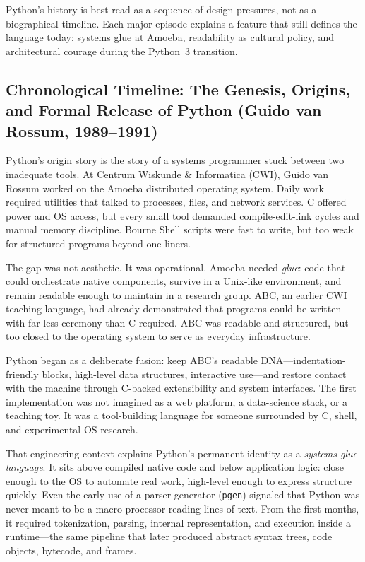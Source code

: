 \documentclass[a4paper,twoside]{report}
\begin{document}
Python's history is best read as a sequence of design pressures, not as a biographical timeline. Each major episode explains a feature that still defines the language today: systems glue at Amoeba, readability as cultural policy, and architectural courage during the Python~3 transition.


\subsection{Chronological Timeline: The Genesis, Origins, and Formal Release of Python (Guido van Rossum, 1989--1991)}

Python's origin story is the story of a systems programmer stuck between two inadequate tools. At Centrum Wiskunde \& Informatica (CWI), Guido van Rossum worked on the Amoeba distributed operating system. Daily work required utilities that talked to processes, files, and network services. C offered power and OS access, but every small tool demanded compile-edit-link cycles and manual memory discipline. Bourne Shell scripts were fast to write, but too weak for structured programs beyond one-liners.

The gap was not aesthetic. It was operational. Amoeba needed \emph{glue}: code that could orchestrate native components, survive in a Unix-like environment, and remain readable enough to maintain in a research group. ABC, an earlier CWI teaching language, had already demonstrated that programs could be written with far less ceremony than C required. ABC was readable and structured, but too closed to the operating system to serve as everyday infrastructure.

Python began as a deliberate fusion: keep ABC's readable DNA---indentation-friendly blocks, high-level data structures, interactive use---and restore contact with the machine through C-backed extensibility and system interfaces. The first implementation was not imagined as a web platform, a data-science stack, or a teaching toy. It was a tool-building language for someone surrounded by C, shell, and experimental OS research.

That engineering context explains Python's permanent identity as a \emph{systems glue language}. It sits above compiled native code and below application logic: close enough to the OS to automate real work, high-level enough to express structure quickly. Even the early use of a parser generator (\texttt{pgen}) signaled that Python was never meant to be a macro processor reading lines of text. From the first months, it required tokenization, parsing, internal representation, and execution inside a runtime---the same pipeline that later produced abstract syntax trees, code objects, bytecode, and frames.
\end{document}
